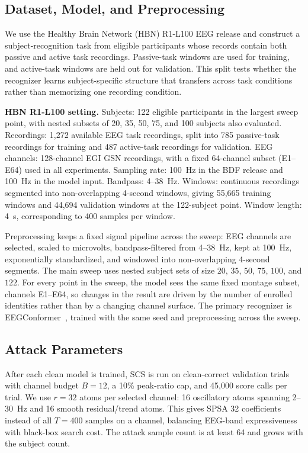 \documentclass[journal]{IEEEtran}
\begin{document}
\subsection{Dataset, Model, and Preprocessing}

We use the Healthy Brain Network (HBN) R1-L100 EEG release and construct a subject-recognition task from eligible participants whose records contain both passive and active task recordings. Passive-task windows are used for training, and active-task windows are held out for validation. This split tests whether the recognizer learns subject-specific structure that transfers across task conditions rather than memorizing one recording condition.

\noindent\textbf{HBN R1-L100 setting.}
Subjects: 122 eligible participants in the largest sweep point, with nested subsets of 20, 35, 50, 75, and 100 subjects also evaluated. Recordings: 1,272 available EEG task recordings, split into 785 passive-task recordings for training and 487 active-task recordings for validation. EEG channels: 128-channel EGI GSN recordings, with a fixed 64-channel subset (E1--E64) used in all experiments. Sampling rate: 100~Hz in the BDF release and 100~Hz in the model input. Bandpass: 4--38~Hz. Windows: continuous recordings segmented into non-overlapping 4-second windows, giving 55,665 training windows and 44,694 validation windows at the 122-subject point. Window length: 4~s, corresponding to 400 samples per window.

Preprocessing keeps a fixed signal pipeline across the sweep: EEG channels are selected, scaled to microvolts, bandpass-filtered from 4--38~Hz, kept at 100~Hz, exponentially standardized, and windowed into non-overlapping 4-second segments. The main sweep uses nested subject sets of size $20$, $35$, $50$, $75$, $100$, and $122$. For every point in the sweep, the model sees the same fixed montage subset, channels E1--E64, so changes in the result are driven by the number of enrolled identities rather than by a changing channel surface. The primary recognizer is EEGConformer~\cite{song2022eegconformer}, trained with the same seed and preprocessing across the sweep.

\subsection{Attack Parameters}

After each clean model is trained, SCS is run on clean-correct validation trials with channel budget $B=12$, a 10\% peak-ratio cap, and 45,000 score calls per trial. We use $r=32$ atoms per selected channel: 16 oscillatory atoms spanning 2--30~Hz and 16 smooth residual/trend atoms. This gives SPSA 32 coefficients instead of all $T=400$ samples on a channel, balancing EEG-band expressiveness with black-box search cost. The attack sample count is at least 64 and grows with the subject count.
\end{document}
